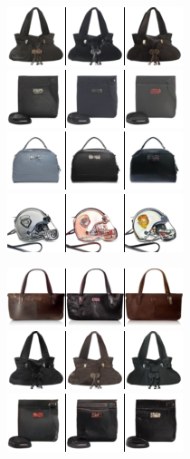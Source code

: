 \begin{figure}[t]
\begin{subfigure}[t]{0.27\textwidth}
      \includegraphics[height=\edgesstuffimgheight]{figs/cigcvae/image-samples/bags/image_aipo_1_t=0.85_imagenet_samples.png}
      \includegraphics[height=\edgesstuffimgheight]{figs/cigcvae/image-samples/bags/image_aipo_2_t=0.85_imagenet_samples.png}
      \includegraphics[height=\edgesstuffimgheight]{figs/cigcvae/image-samples/bags/image_aipo_3_t=0.85_imagenet_samples.png}
      \includegraphics[height=\edgesstuffimgheight]{figs/cigcvae/image-samples/bags/image_aipo_4_t=0.85_imagenet_samples.png}
      \caption{\scriptsize {}}
    \end{subfigure}
    \begin{subfigure}[t]{0.27\textwidth}
      \centering
      \includegraphics[height=\edgesstuffimgheight]{figs/cigcvae/image-samples/bags/image_aipo_0_imagenet_samples.png}
      \includegraphics[height=\edgesstuffimgheight]{figs/cigcvae/image-samples/bags/image_aipo_1_imagenet_samples.png}
      \includegraphics[height=\edgesstuffimgheight]{figs/cigcvae/image-samples/bags/image_aipo_2_imagenet_samples.png}

\end{subfigure}
\end{figure}

